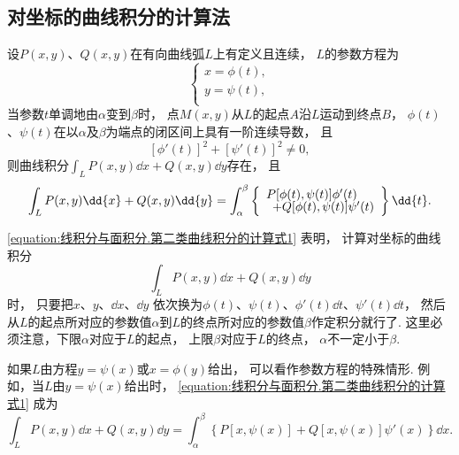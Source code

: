 \subsection{对坐标的曲线积分的计算法}
\begin{theorem}
设\(P(x,y)\)、\(Q(x,y)\)在有向曲线弧\(L\)上有定义且连续，
\(L\)的参数方程为\[
	\left\{ \begin{array}{l}
		x = \phi(t), \\
		y = \psi(t), \\
	\end{array} \right.
\]
当参数\(t\)单调地由\(\alpha\)变到\(\beta\)时，
点\(M(x,y)\)从\(L\)的起点\(A\)沿\(L\)运动到终点\(B\)，
\(\phi(t)\)、\(\psi(t)\)在以\(\alpha\)及\(\beta\)为端点的闭区间上具有一阶连续导数，
且\[
	[\phi'(t)]^2+[\psi'(t)]^2 \neq 0,
\]
则曲线积分\(\int_L{P(x,y)\dd{x} + Q(x,y)\dd{y}}\)存在，
且\begin{equation}\label{equation:线积分与面积分.第二类曲线积分的计算式1}
	\int_L P(x,y) \dd{x} + Q(x,y) \dd{y}
	= \int_\alpha^\beta
		\left\{ \def\arraystretch{.7}\begin{array}{l}
			P[\phi(t),\psi(t)] \phi'(t) \\
			\hspace{5pt}+ Q[\phi(t),\psi(t)] \psi'(t)
		\end{array} \right\} \dd{t}.
\end{equation}
\end{theorem}
\cref{equation:线积分与面积分.第二类曲线积分的计算式1} 表明，
计算对坐标的曲线积分\[
	\int_L P(x,y) \dd{x} + Q(x,y) \dd{y}
\]时，
只要把\(x\)、\(y\)、\(\dd{x}\)、\(\dd{y}\)
依次换为\(\phi(t)\)、\(\psi(t)\)、\(\phi'(t) \dd{t}\)、\(\psi'(t) \dd{t}\)，
然后从\(L\)的起点所对应的参数值\(\alpha\)到\(L\)的终点所对应的参数值\(\beta\)作定积分就行了.
这里必须注意，下限\(\alpha\)对应于\(L\)的起点，
上限\(\beta\)对应于\(L\)的终点，
\(\alpha\)不一定小于\(\beta\).

如果\(L\)由方程\(y = \psi(x)\)或\(x = \phi(y)\)给出，
可以看作参数方程的特殊情形.
例如，当\(L\)由\(y = \psi(x)\)给出时，
\cref{equation:线积分与面积分.第二类曲线积分的计算式1} 成为\[
	\int_L P(x,y) \dd{x} + Q(x,y) \dd{y}
	= \int_\alpha^\beta \left\{
		P[x,\psi(x)] + Q[x,\psi(x)] \psi'(x)
	\right\} \dd{x}.
\]

